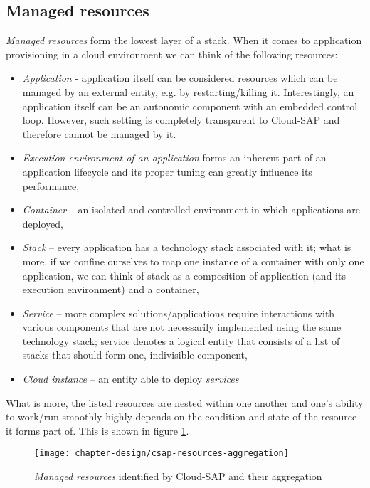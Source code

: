 \subsection{Managed resources}
\emph{Managed resources} form the lowest layer of a stack. When it comes to application provisioning in a cloud environment we can think of the following resources:
\begin{itemize}
  \item \emph{Application} - application itself can be considered resources which can be managed by an external entity, e.g. by restarting/killing it. Interestingly, an application itself can be an autonomic component with an embedded control loop. However, such setting is completely transparent to Cloud-SAP and therefore cannot be managed by it.
  \item \emph{Execution environment of an application} forms an inherent part of an application lifecycle and its proper tuning can greatly influence its performance,
  \item \emph{Container} -- an isolated and controlled environment in which applications are deployed,
  \item \emph{Stack} -- every application has a technology stack associated with it; what is more, if we confine ourselves to map one instance of a container with only one application, we can think of stack as a composition of application (and its execution environment) and a container,
  \item \emph{Service} -- more complex solutions/applications require interactions with various components that are not necessarily implemented using the same technology stack; service denotes a logical entity that consists of a list of stacks that should form one, indivisible component,
  \item \emph{Cloud instance} -- an entity able to deploy \emph{services}
\end{itemize}
What is more, the listed resources are nested within one another and one's ability to work/run smoothly highly depends on the condition and state of the resource it forms part of. This is shown in figure \ref{img:managed-resources-aggregation}.
\begin{figure}[!ht]
  \begin{center}
    \texttt{[image: chapter-design/csap-resources-aggregation]}
  \end{center}
  \caption{\emph{Managed resources} identified by Cloud-SAP and their aggregation}
  \label{img:managed-resources-aggregation}
\end{figure}

